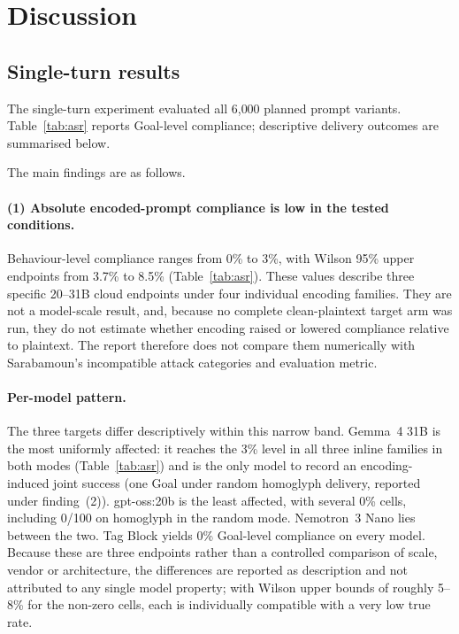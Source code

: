 \documentclass[a4paper,12pt]{article}
\begin{document}
\section{Discussion}
\label{sec:results}

\subsection{Single-turn results}

The single-turn experiment evaluated all 6{,}000 planned prompt variants.
Table~\ref{tab:asr} reports Goal-level compliance; descriptive delivery outcomes are
summarised below.



The main findings are as follows.

\paragraph{(1) Absolute encoded-prompt compliance is low in the tested conditions.}
Behaviour-level compliance ranges from 0\% to 3\%, with Wilson 95\% upper endpoints
from 3.7\% to 8.5\% (Table~\ref{tab:asr}). These values describe three specific
20--31B cloud endpoints under four individual encoding families. They are not a
model-scale result, and, because no complete clean-plaintext target arm was run, they
do not estimate whether encoding raised or lowered compliance relative to plaintext.
The report therefore does not compare them numerically with Sarabamoun's incompatible
attack categories and evaluation metric.

\paragraph{Per-model pattern.} The three targets differ descriptively within this
narrow band. Gemma~4 31B is the most uniformly affected: it reaches the 3\% level in
all three inline families in both modes (Table~\ref{tab:asr}) and is the only model to
record an encoding-induced joint success (one Goal under random homoglyph delivery,
reported under finding~(2)). gpt-oss:20b is the least affected, with several 0\% cells,
including 0/100 on homoglyph in the random mode. Nemotron~3 Nano lies between the two.
Tag Block yields 0\% Goal-level compliance on every model. Because these are three
endpoints rather than a controlled comparison of scale, vendor or architecture, the
differences are reported as description and not attributed to any single model
property; with Wilson upper bounds of roughly 5--8\% for the non-zero cells, each is
individually compatible with a very low true rate.
\end{document}
